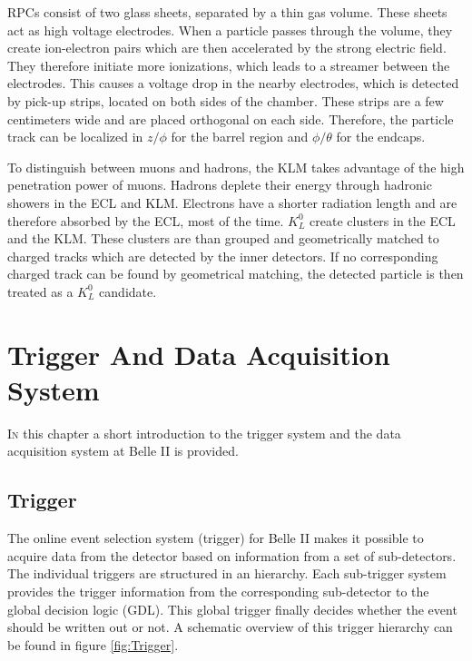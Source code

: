 \documentclass[a4paper,11pt,twosided,final,german,openbib,pdftex,listof=totoc,bibliography=totoc]{scrbook}
\begin{document}
RPCs consist of two glass sheets, separated by a thin gas volume. These sheets act as high voltage electrodes. When a particle passes through the volume, they create ion-electron pairs which are then accelerated by the strong electric field. They therefore initiate more ionizations, which leads to a streamer between the electrodes. This causes a voltage drop in the nearby electrodes, which is detected by pick-up strips, located on both sides of the chamber. These strips are a few centimeters wide and are placed orthogonal on each side. Therefore, the particle track can be localized in $z/\phi$ for the barrel region and $\phi/\theta$ for the endcaps.

To distinguish between muons and hadrons, the KLM takes advantage of the high penetration power of muons. Hadrons deplete their energy through hadronic showers in the ECL and KLM. Electrons have a shorter radiation length and are therefore absorbed by the ECL, most of the time. $K_L^0$ create clusters in the ECL and the KLM. These clusters are than grouped and geometrically matched to charged tracks which are detected by the inner detectors. If no corresponding charged track can be found by geometrical matching, the detected particle is then treated as a $K_L^0$ candidate.\cite{B2TR}\cite{KLMS}

\chapter{Trigger And Data Acquisition System}
\label{sec:TDAS}


\lettrine{I}{n} this chapter a short introduction to the trigger system and the data acquisition system at Belle II is provided.


\section{Trigger}

The online event selection system (trigger) for Belle II makes it possible to acquire data from the detector based on information from a set of sub-detectors. The individual triggers are structured in an hierarchy. Each sub-trigger system provides the trigger information from the corresponding sub-detector to the global decision logic (GDL). This global trigger finally decides whether the event should be written out or not. \cite{B2TR} A schematic overview of this trigger hierarchy can be found in figure \ref{fig:Trigger}.
\end{document}
